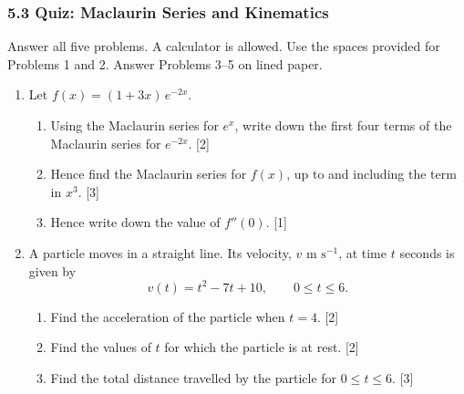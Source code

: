 \documentclass[12pt, twoside]{article}
\begin{document}
\subsubsection*{5.3 Quiz: Maclaurin Series and Kinematics}

Answer all five problems. A calculator is allowed. Use the spaces provided
for Problems 1 and 2. Answer Problems 3--5 on lined paper.

\begin{enumerate}[itemsep=0.15cm]

\item[1.] [Maximum mark: 6]

Let $f(x) = (1 + 3x)\,e^{-2x}$.

\begin{enumerate}[itemsep=0.15cm]
  \item Using the Maclaurin series for $e^{x}$, write down the first four
  terms of the Maclaurin series for $e^{-2x}$. \hfill [2]
  \item Hence find the Maclaurin series for $f(x)$, up to and including
  the term in $x^{3}$. \hfill [3]
  \item Hence write down the value of $f''(0)$. \hfill [1]
\end{enumerate}


\newpage

\item[2.] [Maximum mark: 7]

A particle moves in a straight line. Its velocity, $v \text{ m s}^{-1}$, at
time $t$ seconds is given by
\[
v(t) = t^{2} - 7t + 10, \qquad 0 \leq t \leq 6.
\]

\begin{enumerate}[itemsep=0.15cm]
  \item Find the acceleration of the particle when $t = 4$. \hfill [2]
  \item Find the values of $t$ for which the particle is at rest.
  \hfill [2]
  \item Find the total distance travelled by the particle for
  $0 \leq t \leq 6$. \hfill [3]
\end{enumerate}


\end{enumerate}
\end{document}
